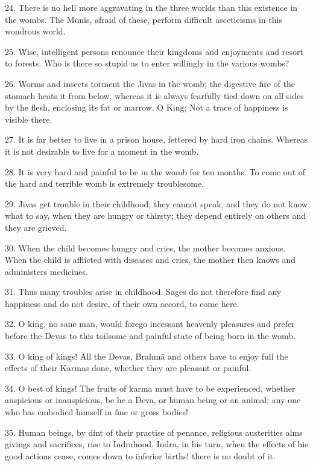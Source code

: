 24. There is no hell more aggravating in the three worlds than this existence in the wombs. The Munis, afraid of these, perform difficult asceticisms in this wondrous world.

25. Wise, intelligent persons renounce their kingdoms and enjoyments and resort to forests. Who is there so stupid as to enter willingly in the various wombs?

26. Worms and insects torment the J\={\i}vas in the womb; the digestive fire of the stomach heats it from below, whereas it is always fearfully tied down on all sides by the flesh, enclosing its fat or marrow. O King; Not a trace of happiness is visible there.

27. It is far better to live in a prison house, fettered by hard iron chains. Whereas it is not desirable to live for a moment in the womb.

28. It is very hard and painful to be in the womb for ten months. To come out of the hard and terrible womb is extremely troublesome.

29. J\={\i}vas get trouble in their childhood; they cannot speak, and they do not know what to say, when they are hungry or thirsty; they depend entirely on others and they are grieved.

30. When the child becomes hungry and cries, the mother becomes anxious. When the child is afflicted with diseases and cries, the mother then knows and administers medicines.

31. Thus many troubles arise in childhood. Sages do not therefore find any happiness and do not desire, of their own accord, to come here.

32. O king, no sane man, would forego incessant heavenly pleasures and prefer before the Devas to this toilsome and painful state of being born in the womb.

33. O king of kings! All the Devas, Brahm\=a and others have to enjoy full the effects of their Karmas done, whether they are pleasant or painful.

34. O best of kings! The fruits of karma must have to be experienced, whether auspicious or inauspicious, be he a Deva, or human being or an animal; any one who has embodied himself in fine or gross bodies!

35. Human beings, by dint of their practise of penance, religious austerities alms givings and sacrifices, rise to Indrahood. Indra, in his turn, when the effects of his good actions cease, comes down to inferior births! there is no doubt of it.

